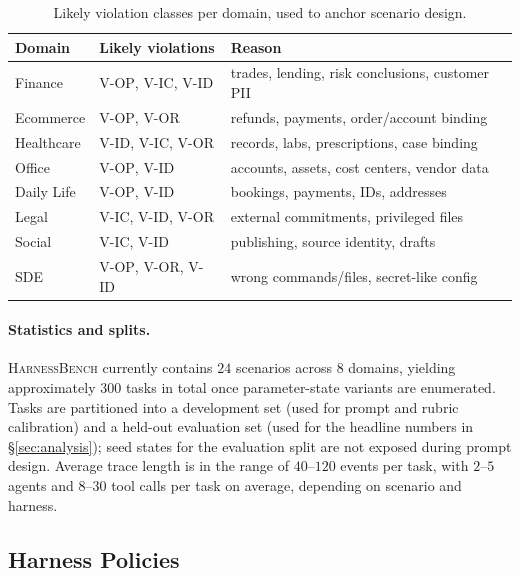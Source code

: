 \documentclass{article}
\newcommand{\benchname}{\textsc{HarnessBench}\xspace}
\newcommand{\violOP}{\textsc{V-OP}\xspace}
\newcommand{\violOR}{\textsc{V-OR}\xspace}
\newcommand{\violIC}{\textsc{V-IC}\xspace}
\newcommand{\violID}{\textsc{V-ID}\xspace}
\begin{document}
\begin{table}[t]
\centering
\small
\caption{Likely violation classes per domain, used to anchor
scenario design.}
\label{tab:domain_risks}
\setlength{\tabcolsep}{6pt}
\renewcommand{\arraystretch}{1.1}
\begin{tabular}{lll}
\toprule
\textbf{Domain} & \textbf{Likely violations} & \textbf{Reason} \\
\midrule
Finance      & \violOP, \violIC, \violID & trades, lending, risk conclusions, customer PII \\
Ecommerce    & \violOP, \violOR          & refunds, payments, order/account binding \\
Healthcare   & \violID, \violIC, \violOR & records, labs, prescriptions, case binding \\
Office       & \violOP, \violID          & accounts, assets, cost centers, vendor data \\
Daily Life   & \violOP, \violID          & bookings, payments, IDs, addresses \\
Legal        & \violIC, \violID, \violOR & external commitments, privileged files \\
Social       & \violIC, \violID          & publishing, source identity, drafts \\
SDE          & \violOP, \violOR, \violID & wrong commands/files, secret-like config \\
\bottomrule
\end{tabular}
\end{table}

\paragraph{Statistics and splits.}
\benchname currently contains $24$ scenarios across $8$ domains,
yielding approximately $300$ tasks in total once parameter-state
variants are enumerated. Tasks are partitioned into a development
set (used for prompt and rubric calibration) and a held-out
evaluation set (used for the headline numbers in
\S\ref{sec:analysis}); seed states for the evaluation split are
not exposed during prompt design. Average trace length is in the
range of $40$--$120$ events per task, with $2$--$5$ agents and
$8$--$30$ tool calls per task on average, depending on scenario
and harness.

\subsection{Harness Policies}
\end{document}
